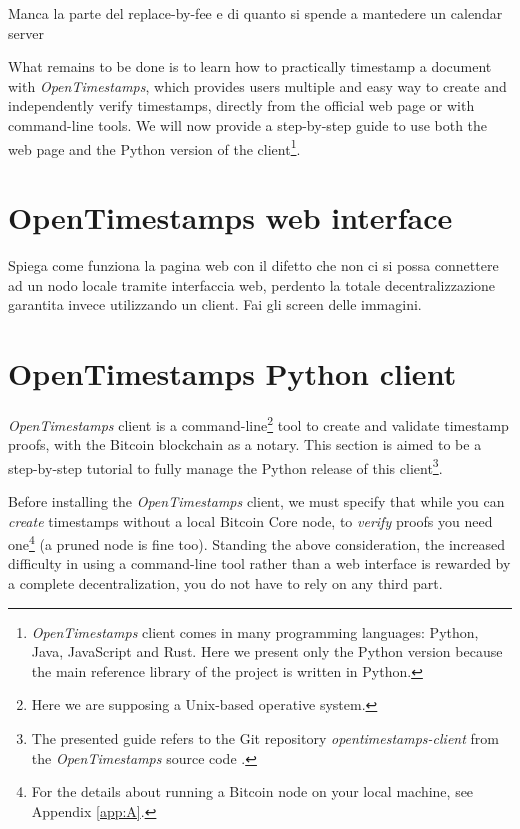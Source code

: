 \bigskip
\noindent
Manca la parte del replace-by-fee e di quanto si spende a mantedere un calendar server

\bigskip
\noindent
What remains to be done is to learn how to practically timestamp a document with \textit{OpenTimestamps}, which provides users multiple and easy way to create and independently verify timestamps, directly from the official web page \cite{OTSWeb} or with command-line tools. We will now provide a step-by-step guide to use both the web page and the Python version of the client\footnote{\textit{OpenTimestamps} client comes in many programming languages: Python, Java, JavaScript and Rust. Here we present only the Python version because the main reference library of the project is written in Python.}.

\bigskip
\section{OpenTimestamps web interface}
Spiega come funziona la pagina web con il difetto che non ci si possa connettere ad un nodo locale tramite interfaccia web, perdento la totale decentralizzazione garantita invece utilizzando un client. Fai gli screen delle immagini.

\bigskip
\section{OpenTimestamps Python client}
\textit{OpenTimestamps} client is a command-line\footnote{Here we are supposing a Unix-based operative system.} tool to create and validate timestamp proofs, with the Bitcoin blockchain as a notary. This section is aimed to be a step-by-step tutorial to fully manage the Python release of this client\footnote{The presented guide refers to the Git repository \textit{opentimestamps-client} from the \textit{OpenTimestamps} source code \cite{OpenTimestampsGithub}.}.

\bigskip
\noindent
Before installing the \textit{OpenTimestamps} client, we must specify that while you can \textit{create} timestamps without a local Bitcoin Core node, to \textit{verify} proofs you need one\footnote{For the details about running a Bitcoin node on your local machine, see Appendix \ref{app:A}.} (a pruned node is fine too). Standing the above consideration, the increased difficulty in using a command-line tool rather than a web interface is rewarded by a complete decentralization, you do not have to rely on any third part.

